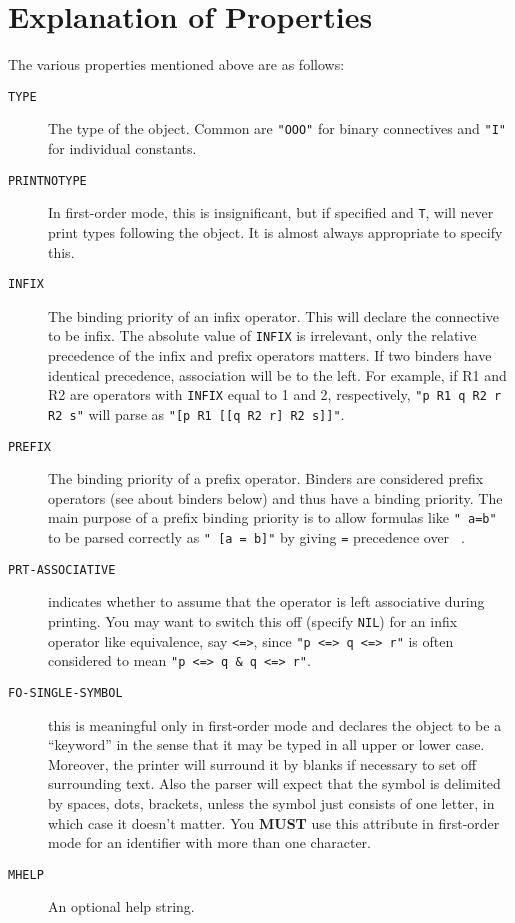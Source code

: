 \section{Explanation of Properties}
The various properties mentioned above are as follows:
\begin{description}
\item [{\tt TYPE} ] The type of the object.  Common are {\tt "OOO"} for
binary connectives and {\tt "I"} for individual constants.

\item [{\tt PRINTNOTYPE} ] In first-order mode, this is insignificant, but
if specified and {\tt T}, \TPS will never print types following the object.
It is almost always appropriate to specify this.

\item [{\tt INFIX} ] The binding priority of an infix operator.  This will declare
the connective to be infix.  The absolute value of {\tt INFIX} is irrelevant,
only the relative precedence of the infix and prefix operators matters.
If two binders have identical precedence, association will be to the left.
For example, if R1 and R2 are operators with {\tt INFIX} equal to 1 and 2,
respectively, {\tt "p R1 q R2 r R2 s"} will parse as 
{\tt "[p R1 [[q R2 r] R2 s]]"}.

\item [{\tt PREFIX} ] The binding priority of a prefix operator.  Binders are considered
prefix operators (see about binders below) and thus have a binding
priority.  The main purpose of a prefix binding priority is to allow
formulas like {\tt "~a=b"} to be parsed correctly as {\tt "~[a = b]"} by
giving {\tt =} precedence over {\tt ~}.

\item [{\tt PRT-ASSOCIATIVE} ] indicates whether to assume that the operator is
left associative during printing.  You may want to switch this off (specify
{\tt NIL}) for an infix operator like equivalence, say {\tt <=>}, since
{\tt "p <=> q <=> r"} is often considered to mean {\tt "p <=> q \& q <=> r"}.

\item [{\tt FO-SINGLE-SYMBOL} ] this is meaningful only in first-order mode and
declares the object to be a ``keyword'' in the sense that
it may be typed in all upper or lower case.  Moreover, the printer will
surround it by blanks if necessary to set off surrounding text.  Also
the parser will expect that the symbol is delimited by spaces, dots,
brackets, unless the symbol just consists of one letter, in which case
it doesn't matter.  You {\bf MUST} use this attribute in first-order
mode for an identifier with more than one character.

\item [{\tt MHELP} ] An optional help string.
\end{description}

